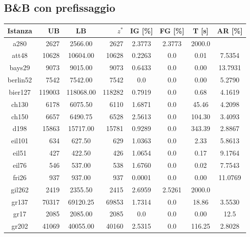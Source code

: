\subsection{B\&B con prefissaggio}
\begin{scriptsize}
\begin{center}
    \begin{longtabu} to \linewidth {c|rS[table-format=6.2]r|S[table-format=2.4]S[table-format=2.4]S[table-format=4.2]S[table-format=4.4]}
    \toprule
    Istanza & UB & LB & $z^*$ & IG [\%] & FG [\%] & T [s] & AR [\%] \\
    \midrule
    \endhead
\label{tab:bbconstres}
a280 & 2627 & 2566.00 & 2627 & 2.3773 & 2.3773 & 2000.0 &  \\
att48 & 10628 & 10604.00 & 10628 & 0.2263 & 0.0 & 0.01 & 7.5354 \\
bays29 & 9073 & 9015.00 & 9073 & 0.6433 & 0.0 & 0.00 & 13.7931 \\
berlin52 & 7542 & 7542.00 & 7542 & 0.0 & 0.0 & 0.00 & 5.2790 \\
bier127 & 119003 & 118068.00 & 118282 & 0.7919 & 0.0 & 0.68 & 4.1619 \\
ch130 & 6178 & 6075.50 & 6110 & 1.6871 & 0.0 & 45.46 & 4.2098 \\
ch150 & 6657 & 6490.75 & 6528 & 2.5613 & 0.0 & 104.30 & 3.4093 \\
d198 & 15863 & 15717.00 & 15781 & 0.9289 & 0.0 & 343.39 & 2.8867 \\
eil101 & 634 & 627.50 & 629 & 1.0363 & 0.0 & 2.33 & 5.8613 \\
eil51 & 427 & 422.50 & 426 & 1.0654 & 0.0 & 0.17 & 9.1764 \\
eil76 & 546 & 537.00 & 538 & 1.6760 & 0.0 & 0.02 & 7.7543 \\
fri26 & 937 & 937.00 & 937 & 0.0001 & 0.0 & 0.00 & 11.0769 \\
gil262 & 2419 & 2355.50 & 2415 & 2.6959 & 2.5261 & 2000.0 &  \\
gr137 & 70317 & 69120.25 & 69853 & 1.7314 & 0.0 & 18.86 & 3.5530 \\
gr17 & 2085 & 2085.00 & 2085 & 0.0 & 0.0 & 0.00 & 12.5 \\
gr202 & 41069 & 40055.00 & 40160 & 2.5315 & 0.0 & 116.25 & 2.8028 \\

\end{longtabu}
\end{center}
\end{scriptsize}
